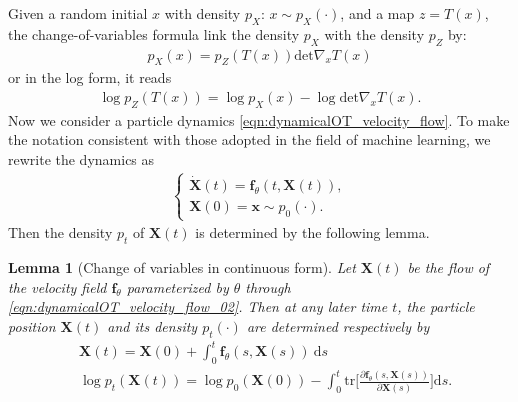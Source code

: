 \documentclass[11pt]{book}
\newtheorem{lemma}[theorem]{Lemma}
\begin{document}
Given a random initial $x$ with density $p_X$: $x \sim p_{X}(\cdot)$, and a map $z = T(x)$, the change-of-variables formula link the density $p_X$ with the density $p_Z$ by:
\begin{align}\label{eqn:change_of_variables}
    p_{X}(x) = p_Z(T(x)) \mathrm{det}\nabla_x T(x)
\end{align}
or in the log form, it reads
\begin{align}\label{eqn:change_of_variables_log}
    \log p_Z(T(x)) = \log p_X(x) - \log \mathrm{det}\nabla_x T(x).
\end{align}
Now we consider a particle dynamics \eqref{eqn:dynamicalOT_velocity_flow}. To make the notation consistent with those adopted in the field of machine learning, we rewrite the dynamics as
\begin{align}\label{eqn:dynamicalOT_velocity_flow_02}
    \begin{cases}
        \dot{\mathbf{X}}(t) = \mathbf{f}_{\theta}(t, \mathbf{X}(t)), \\
        \mathbf{X}(0) = \mathbf{x} \sim p_0(\cdot).
    \end{cases}
\end{align}
Then the density $p_t$ of $\mathbf{X}(t)$ is determined by the following lemma.
\begin{lemma}[Change of variables in continuous form]
    Let $\mathbf{X}(t)$ be the flow of the velocity field $\mathbf{f}_{\theta}$ parameterized by $\theta$ through \eqref{eqn:dynamicalOT_velocity_flow_02}. Then at any later time $t$, the particle position $\mathbf{X}(t)$ and its density $p_t(\cdot)$ are determined respectively by
    \begin{align}
        &\mathbf{X}(t) = \mathbf{X}(0) + \int_0^t \mathbf{f}_{\theta}(s,\mathbf{X}(s)) \ \mathrm{d}s \label{eqn:position_eqn}\\
        &\log p_t(\mathbf{X}(t)) = \log p_0(\mathbf{X}(0)) - \int_0^t \mathrm{tr}\bigg[  \frac{\partial \mathbf{f}_{\theta}(s,\mathbf{X}(s))}{\partial \mathbf{X}(s)}  \bigg] \mathrm{d}s. \label{eqn:density_eqn}
    \end{align}
\end{lemma}
\end{document}
